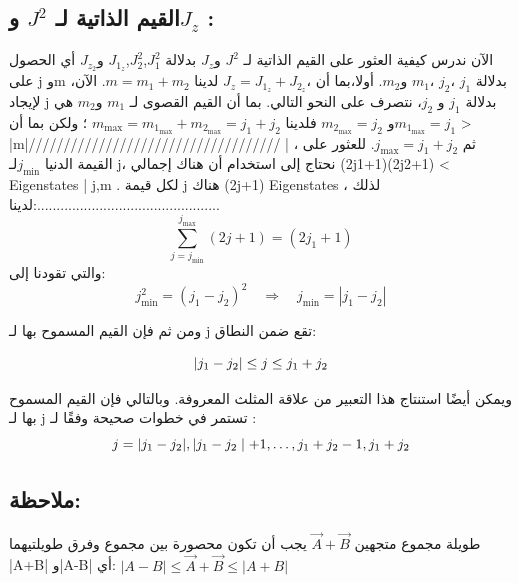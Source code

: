 \subsection{القيم الذاتية لـ $J^2$ و$J_z$  :}

الآن ندرس كيفية العثور على القيم الذاتية لـ  $J^2 $ 
و$J_z$ بدلالة $J^2_1$,$ J^2_2$,$ J_{1_z}$ و$J_{z_2} $
 أي الحصول على j وm بدلالة  $j_1$  ،$j_2$ ،$m_1 $ و$m_2 $.  أولا،بما أن  $J_z = J_{1_z} + J_{2_z}،$ لدينا $m = m_1+ m_2 $. الآن، لإيجاد j بدلالة $j_1 $ و $j_2 $، نتصرف على النحو التالي. بما أن القيم القصوى لـ $m_1 $ و$m_2 $ هي   
  $ m_{1_{\max } }= j_1 $و $m_{2_{\max } }= j_2 $ 
 فلدينا 
$m_{\max } = m_{1_{\max }} + m_{2_{\max } }  = j_1+ j_2  $
؛ ولكن بما أن > |m|//////////////////////////////////// 
|  ، ثم $j_{\max }= j_1+ j_2$.
للعثور على القيمة الدنيا $j_{\min }$لـ j، نحتاج إلى استخدام أن هناك إجمالي 
(2j1+1)(2j2+1) < Eigenstates | j,m .  لكل قيمة j هناك (2j+1) Eigenstates  ، لذلك لدينا:...............................................
\begin{equation}
\sum_{j=j_{\min }}^{j_{\max }}(2 j+1)=\left(2 j_1+1\right)
\end{equation}
والتي تقودنا إلى:
\begin{equation}
 j_{\min }^2=\left(j_1-j_2\right)^2 \quad \Longrightarrow \quad j_{\min }=\left|j_1-j_2\right|
\end{equation}

ومن ثم فإن القيم المسموح بها لـ j تقع ضمن النطاق:

\begin{equation}
	\left|j_1-j_2\right| \leq j \leq j_1+j_2 \\
\end{equation}

ويمكن أيضًا استنتاج هذا التعبير من علاقة المثلث المعروفة. وبالتالي فإن القيم المسموح بها لـ j تستمر في خطوات صحيحة وفقًا لـ :
\begin{equation}
	j=| j_1-j_2|,| j_1-j_2 \mid+1, \ldots, j_1+j_2-1, j_1+j_2  \\
\end{equation}
\subsection*{ملاحظة:}
طويلة مجموع متجهين
 $\vec{A}+\vec{B}$
 يجب أن تكون محصورة بين مجموع وفرق طويلتيهما
 |A+B| و|A-B| أي:
$ |A-B|\leq \vec{A}+\vec{B} \leq|A+B|$





















